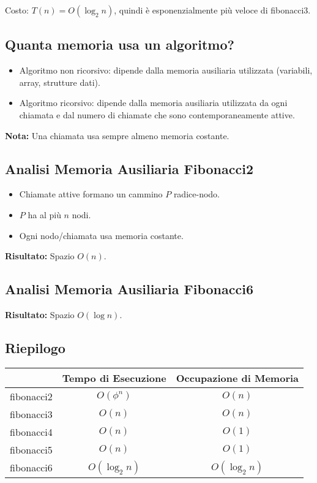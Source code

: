 \documentclass{article}
\begin{document}
Costo: $T(n) = O(\log_2 n)$, quindi è esponenzialmente più veloce di fibonacci3.

\subsection{Quanta memoria usa un algoritmo?}
\begin{itemize}
\item Algoritmo non ricorsivo: dipende dalla memoria ausiliaria utilizzata (variabili, array, strutture dati).
\item Algoritmo ricorsivo: dipende dalla memoria ausiliaria utilizzata da ogni chiamata e dal numero di chiamate che sono contemporaneamente attive.
\end{itemize}

\textbf{Nota:} Una chiamata usa sempre almeno memoria costante.

\subsection{Analisi Memoria Ausiliaria Fibonacci2}
\begin{itemize}
\item Chiamate attive formano un cammino $P$ radice-nodo.
\item $P$ ha al più $n$ nodi.
\item Ogni nodo/chiamata usa memoria costante.
\end{itemize}

\textbf{Risultato:} Spazio $O(n)$.

\subsection{Analisi Memoria Ausiliaria Fibonacci6}
\textbf{Risultato:} Spazio $O(\log n)$.

\subsection{Riepilogo}
\begin{tabular}{|c|c|c|}
  \hline
    & Tempo di Esecuzione & Occupazione di Memoria \\
  \hline
  fibonacci2& $O(\phi^n)$ & $O(n)$ \\
  \hline
  fibonacci3& $O(n)$ & $O(n)$ \\
  \hline
  fibonacci4& $O(n)$ & $O(1)$ \\
  \hline
  fibonacci5& $O(n)$ & $O(1)$ \\
  \hline
  fibonacci6& $O(\log_2n)$ & $O(\log_2n)$ \\
  \hline
\end{tabular}
\end{document}
